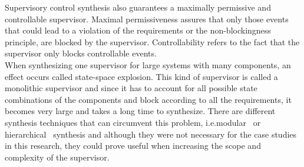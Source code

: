 Supervisory control synthesis also guarantees a maximally permissive and controllable supervisor.
Maximal permissiveness assures that only those events that could lead to a violation of the requirements or the non-blockingness principle, are blocked by the supervisor.
Controllability refers to the fact that the supervisor only blocks controllable events.\\ 


When synthesizing one supervisor for large systems with many components, an effect occurs called state-space explosion. 
This kind of supervisor is called a monolithic supervisor and since it has to account for all possible state combinations of the components and block according to all the requirements, it becomes very large and takes a long time to synthesize.
There are different synthesis techniques that can circumvent this problem, i.e.\@ modular~\cite{modular} or hierarchical~\cite{hierachical} synthesis and although they were not necessary for the case studies in this research, they could prove useful when increasing the scope and complexity of the supervisor.\\


